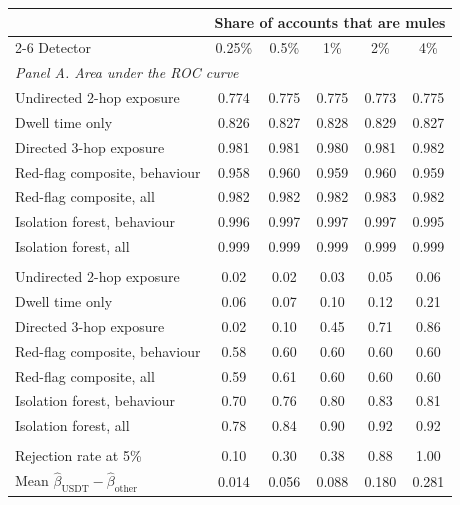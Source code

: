 \begin{tabular}{lccccc}
\toprule
 & \multicolumn{5}{c}{Share of accounts that are mules} \\
\cmidrule(lr){2-6}
Detector & 0.25\% & 0.5\% & 1\% & 2\% & 4\% \\
\midrule
\multicolumn{6}{l}{\emph{Panel A. Area under the ROC curve}} \\
Undirected 2-hop exposure & 0.774 & 0.775 & 0.775 & 0.773 & 0.775 \\
Dwell time only & 0.826 & 0.827 & 0.828 & 0.829 & 0.827 \\
Directed 3-hop exposure & 0.981 & 0.981 & 0.980 & 0.981 & 0.982 \\
Red-flag composite, behaviour & 0.958 & 0.960 & 0.959 & 0.960 & 0.959 \\
Red-flag composite, all & 0.982 & 0.982 & 0.982 & 0.983 & 0.982 \\
Isolation forest, behaviour & 0.996 & 0.997 & 0.997 & 0.997 & 0.995 \\
Isolation forest, all & 0.999 & 0.999 & 0.999 & 0.999 & 0.999 \\
\addlinespace
\multicolumn{6}{l}{\emph{Panel B. Precision at $k$}} \\
Undirected 2-hop exposure & 0.02 & 0.02 & 0.03 & 0.05 & 0.06 \\
Dwell time only & 0.06 & 0.07 & 0.10 & 0.12 & 0.21 \\
Directed 3-hop exposure & 0.02 & 0.10 & 0.45 & 0.71 & 0.86 \\
Red-flag composite, behaviour & 0.58 & 0.60 & 0.60 & 0.60 & 0.60 \\
Red-flag composite, all & 0.59 & 0.61 & 0.60 & 0.60 & 0.60 \\
Isolation forest, behaviour & 0.70 & 0.76 & 0.80 & 0.83 & 0.81 \\
Isolation forest, all & 0.78 & 0.84 & 0.90 & 0.92 & 0.92 \\
\addlinespace
\multicolumn{6}{l}{\emph{Panel C. Bunching-difference test}} \\
Rejection rate at 5\% & 0.10 & 0.30 & 0.38 & 0.88 & 1.00 \\
Mean $\hat\beta_{\mathrm{USDT}}-\hat\beta_{\mathrm{other}}$ & 0.014 & 0.056 & 0.088 & 0.180 & 0.281 \\
\bottomrule
\end{tabular}